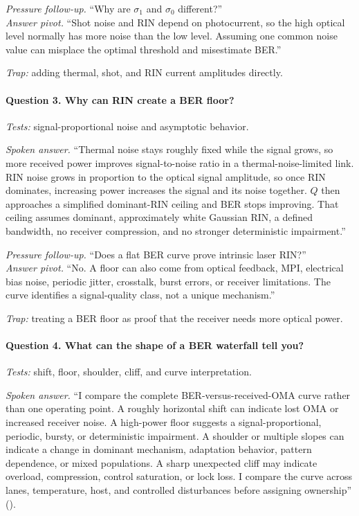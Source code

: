 \textit{Pressure follow-up.} ``Why are $\sigma_1$ and $\sigma_0$ different?''\\
\textit{Answer pivot.} ``Shot noise and RIN depend on photocurrent, so the high
optical level normally has more noise than the low level. Assuming one common
noise value can misplace the optimal threshold and misestimate BER.''

\textit{Trap:} adding thermal, shot, and RIN current amplitudes directly.

\paragraph{Question 3. Why can RIN create a BER floor?}
\textit{Tests:} signal-proportional noise and asymptotic behavior.

\textit{Spoken answer.}
``Thermal noise stays roughly fixed while the signal grows, so more received
power improves signal-to-noise ratio in a thermal-noise-limited link. RIN noise
grows in proportion to the optical signal amplitude, so once RIN dominates,
increasing power increases the signal and its noise together. $Q$ then approaches
a simplified dominant-RIN ceiling and BER stops improving. That ceiling assumes
dominant, approximately white Gaussian RIN, a defined bandwidth, no receiver
compression, and no stronger deterministic impairment.''

\textit{Pressure follow-up.} ``Does a flat BER curve prove intrinsic laser
RIN?''\\
\textit{Answer pivot.} ``No. A floor can also come from optical feedback, MPI,
electrical bias noise, periodic jitter, crosstalk, burst errors, or receiver
limitations. The curve identifies a signal-quality class, not a unique
mechanism.''

\textit{Trap:} treating a BER floor as proof that the receiver needs more
optical power.

\paragraph{Question 4. What can the shape of a BER waterfall tell you?}
\textit{Tests:} shift, floor, shoulder, cliff, and curve interpretation.

\textit{Spoken answer.}
``I compare the complete BER-versus-received-OMA curve rather than one operating
point. A roughly horizontal shift can indicate lost OMA or increased receiver
noise. A high-power floor suggests a signal-proportional, periodic, bursty, or
deterministic impairment. A shoulder or multiple slopes can indicate a change in
dominant mechanism, adaptation behavior, pattern dependence, or mixed
populations. A sharp unexpected cliff may indicate overload, compression,
control saturation, or lock loss. I compare the curve across lanes, temperature,
host, and controlled disturbances before assigning ownership''
().

